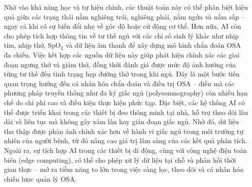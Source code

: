 Nhờ vào khả năng học và tự hiệu chỉnh, các thuật toán này có thể phân biệt hiệu quả giữa các trạng thái nằm nghiêng trái, nghiêng phải, nằm ngửa và nằm sấp – ngay cả khi có sự biến đổi nhẹ về góc độ hoặc cử động cơ thể. Hơn nữa, AI còn cho phép tích hợp thông tin về tư thế ngủ với các chỉ số sinh lý khác như nhịp tim, nhịp thở, SpO$_2$ và dữ liệu âm thanh để xây dựng mô hình chẩn đoán OSA đa chiều. Việc kết hợp các nguồn dữ liệu này giúp phát hiện chính xác các giai đoạn ngưng thở và giảm thở, đồng thời đánh giá được mức độ ảnh hưởng của từng tư thế đến tình trạng hẹp đường thở trong khi ngủ. Đây là một bước tiến quan trọng hướng đến cá nhân hóa chẩn đoán và điều trị OSA – điều mà các phương pháp truyền thống như đa ký giấc ngủ (polysomnography) còn nhiều hạn chế do chi phí cao và điều kiện thực hiện phức tạp. Đặc biệt, các hệ thống AI có thể được triển khai trong các thiết bị đeo thông minh tại nhà, hỗ trợ theo dõi lâu dài và liên tục mà không gây xâm lấn hay gián đoạn giấc ngủ. Nhờ đó, dữ liệu thu thập được phản ánh chính xác hơn về hành vi giấc ngủ trong môi trường tự nhiên của người bệnh, từ đó nâng cao giá trị lâm sàng của các kết quả phân tích. Ngoài ra, sự tích hợp AI trong các thiết bị di động, cùng với công nghệ điện toán biên (edge computing), có thể cho phép xử lý dữ liệu tại chỗ và phản hồi thời gian thực – mở ra tiềm năng to lớn trong việc sàng lọc, theo dõi và cá nhân hóa chiến lược quản lý OSA.

















% 


